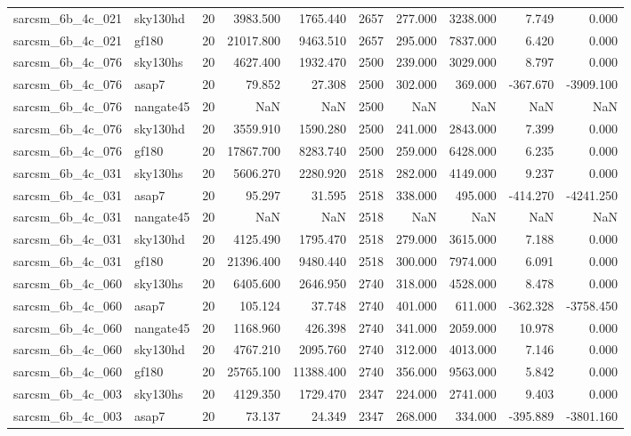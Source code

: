\begin{longtable}{llrrrrrrrr}
sarcsm\_6b\_4c\_021 & sky130hd & 20 & 3983.500 & 1765.440 & 2657 & 277.000 & 3238.000 & 7.749 & 0.000 \\
sarcsm\_6b\_4c\_021 & gf180 & 20 & 21017.800 & 9463.510 & 2657 & 295.000 & 7837.000 & 6.420 & 0.000 \\
sarcsm\_6b\_4c\_076 & sky130hs & 20 & 4627.400 & 1932.470 & 2500 & 239.000 & 3029.000 & 8.797 & 0.000 \\
sarcsm\_6b\_4c\_076 & asap7 & 20 & 79.852 & 27.308 & 2500 & 302.000 & 369.000 & -367.670 & -3909.100 \\
sarcsm\_6b\_4c\_076 & nangate45 & 20 & NaN & NaN & 2500 & NaN & NaN & NaN & NaN \\
sarcsm\_6b\_4c\_076 & sky130hd & 20 & 3559.910 & 1590.280 & 2500 & 241.000 & 2843.000 & 7.399 & 0.000 \\
sarcsm\_6b\_4c\_076 & gf180 & 20 & 17867.700 & 8283.740 & 2500 & 259.000 & 6428.000 & 6.235 & 0.000 \\
sarcsm\_6b\_4c\_031 & sky130hs & 20 & 5606.270 & 2280.920 & 2518 & 282.000 & 4149.000 & 9.237 & 0.000 \\
sarcsm\_6b\_4c\_031 & asap7 & 20 & 95.297 & 31.595 & 2518 & 338.000 & 495.000 & -414.270 & -4241.250 \\
sarcsm\_6b\_4c\_031 & nangate45 & 20 & NaN & NaN & 2518 & NaN & NaN & NaN & NaN \\
sarcsm\_6b\_4c\_031 & sky130hd & 20 & 4125.490 & 1795.470 & 2518 & 279.000 & 3615.000 & 7.188 & 0.000 \\
sarcsm\_6b\_4c\_031 & gf180 & 20 & 21396.400 & 9480.440 & 2518 & 300.000 & 7974.000 & 6.091 & 0.000 \\
sarcsm\_6b\_4c\_060 & sky130hs & 20 & 6405.600 & 2646.950 & 2740 & 318.000 & 4528.000 & 8.478 & 0.000 \\
sarcsm\_6b\_4c\_060 & asap7 & 20 & 105.124 & 37.748 & 2740 & 401.000 & 611.000 & -362.328 & -3758.450 \\
sarcsm\_6b\_4c\_060 & nangate45 & 20 & 1168.960 & 426.398 & 2740 & 341.000 & 2059.000 & 10.978 & 0.000 \\
sarcsm\_6b\_4c\_060 & sky130hd & 20 & 4767.210 & 2095.760 & 2740 & 312.000 & 4013.000 & 7.146 & 0.000 \\
sarcsm\_6b\_4c\_060 & gf180 & 20 & 25765.100 & 11388.400 & 2740 & 356.000 & 9563.000 & 5.842 & 0.000 \\
sarcsm\_6b\_4c\_003 & sky130hs & 20 & 4129.350 & 1729.470 & 2347 & 224.000 & 2741.000 & 9.403 & 0.000 \\
sarcsm\_6b\_4c\_003 & asap7 & 20 & 73.137 & 24.349 & 2347 & 268.000 & 334.000 & -395.889 & -3801.160 \\

\end{longtable}
